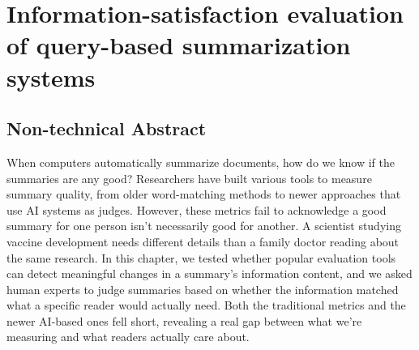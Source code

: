 \chapter{Information-satisfaction evaluation of query-based summarization systems} \label{chap:chap-7}


\section*{Non-technical Abstract}
When computers automatically summarize documents, how do we know if the summaries are any good? Researchers have built various tools to measure summary quality, from older word-matching methods to newer approaches that use AI systems as judges. However, these metrics fail to acknowledge a good summary for one person isn't necessarily good for another. A scientist studying vaccine development needs different details than a family doctor reading about the same research. In this chapter, we tested whether popular evaluation tools can detect meaningful changes in a summary's information content, and we asked human experts to judge summaries based on whether the information matched what a specific reader would actually need. Both the traditional metrics and the newer AI-based ones fell short, revealing a real gap between what we're measuring and what readers actually care about.










